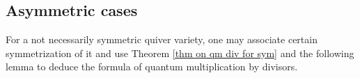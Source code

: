 \documentclass[10pt]{amsart}
\theoremstyle{definition}
\newtheorem{Lemma}[Theorem]{Lemma}
\numberwithin{equation}{section}
\newcommand{\sT}{\mathsf{T}}
\begin{document}


\subsection{Asymmetric cases}

For a not necessarily symmetric quiver variety, one may associate certain symmetrization of it and use Theorem \ref{thm on qm div for sym} and the 
following lemma to deduce the formula of quantum multiplication by divisors. 
\end{document}
